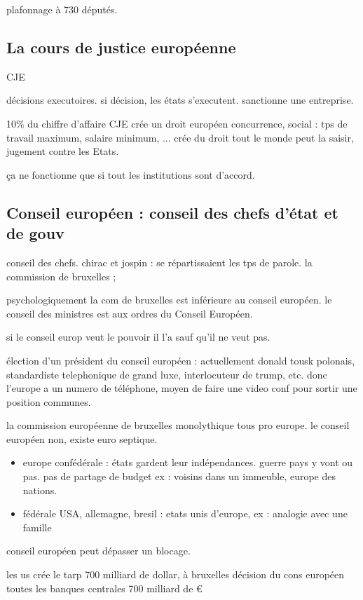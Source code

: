 \documentclass[a4paper,12pt]{article}
\begin{document}
plafonnage à 730 députés. 


\subsection{La cours de justice européenne} CJE

décisions executoires.
si décision, les états s'executent.
sanctionne une entreprise.

10\% du chiffre d'affaire
CJE crée un droit européen concurrence, social : tps de travail maximum, salaire minimum, ...
crée du droit tout le monde peut la saisir, jugement contre les Etats.


ça ne fonctionne que si tout les institutions sont d'accord.

\subsection{Conseil européen : conseil des chefs d'état et de gouv}
conseil des chefs. 
chirac et jospin : se répartissaient les tps de parole.
la commission de bruxelles ; 

psychologiquement la com de bruxelles est inférieure au conseil européen.
le conseil des ministres est aux ordres du Conseil Européen.

si le conseil europ veut le pouvoir il l'a sauf qu'il ne veut pas.

élection d'un président du conseil européen : actuellement donald tousk polonais,
standardiste telephonique de grand luxe, interlocuteur de trump, etc.
donc l'europe a un numero de téléphone, moyen de faire une video conf pour sortir une 
position communes.

la commission européenne de bruxelles monolythique tous pro europe.
le conseil européen non, existe euro septique.


\begin{itemize}
	\item europe confédérale : états gardent leur indépendances. guerre pays y vont ou pas. 
	pas de partage de budget ex : voisins dans un immeuble, europe des nations.
	\item fédérale USA, allemagne, bresil : etats unis d'europe, ex : analogie avec une famille 
\end{itemize}

conseil européen peut dépasser un blocage.

les us crée le tarp 700 milliard de dollar, à bruxelles décision du cons européen
toutes les banques centrales 700 milliard de € 
\end{document}
